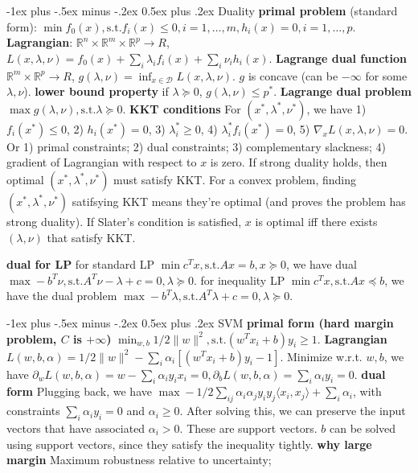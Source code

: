 \documentclass[10pt,landscape]{article}
\makeatletter
\renewcommand{\section}{\@startsection{section}{1}{0mm}%
                                {-1ex plus -.5ex minus -.2ex}%
                                {0.5ex plus .2ex}%
                                {\normalfont\large\bfseries}}
\makeatother
\begin{document}
\begin{multicols}{3}
\section{Duality}
\textbf{primal problem} (standard form): $\min f_0(x), \text{s.t.} f_i(x) \leq 0, i = 1,\ldots,m, h_i(x)=0, i = 1,\ldots,p$.
\textbf{Lagrangian}: $\mathbb{R}^n \times \mathbb{R}^m \times \mathbb{R}^p \rightarrow R$, $L(x,\lambda,\nu) = f_0(x) + \sum_i \lambda_i f_i (x) + \sum_i \nu_i h_i(x)$.
\textbf{Lagrange dual function} $\mathbb{R}^m \times \mathbb{R}^p \rightarrow R$, $g(\lambda, \nu) = \inf_{x \in \mathcal{D}} L(x, \lambda, \nu)$. $g$ is concave (can be $-\infty$ for some $\lambda,\nu$). \textbf{lower bound property} if $\lambda \succeq 0$, $g(\lambda, \nu) \leq p^*$.
\textbf{Lagrange dual problem} $\max g(\lambda,\nu), \text{s.t.} \lambda \succeq 0$. \textbf{KKT conditions} For $(x^*, \lambda^*, \nu^*)$, we have 1) $f_i(x^*) \leq 0$, 2) $h_i(x^*) = 0$, 3) $\lambda^*_i \geq 0$, 4) $\lambda^*_i f_i(x^*) = 0$, 5) $\nabla_x L(x,\lambda,\nu) = 0$. Or 1) primal constraints; 2) dual constraints; 3) complementary slackness; 4) gradient of Lagrangian with respect to $x$ is zero. If strong duality holds, then optimal $(x^*, \lambda^*, \nu^*)$ must satisfy KKT. For a convex problem, finding $(x^*, \lambda^*, \nu^*)$ satifsying KKT means they're optimal (and proves the problem has strong duality). If Slater's condition is satisfied, $x$ is optimal iff there exists $(\lambda, \nu)$ that satisfy KKT.

\textbf{dual for LP} for standard LP $\min c^T x, \text{s.t.} Ax=b, x \succeq 0$, we have dual $\max -b^T \nu, \text{s.t.} A^T\nu - \lambda + c = 0, \lambda \succeq 0$. for inequality LP $\min c^T x, \text{s.t.} Ax\preceq b$, we have the dual problem $\max -b^T \lambda, \text{s.t.} A^T\lambda + c = 0, \lambda \succeq 0$.

\section{SVM}
\textbf{primal form (hard margin problem, $C$ is $+\infty$)} $\min_{w,b} 1/2 \|w\|^2, \text{s.t.} (w^T x_i + b)y_i \geq 1$.
\textbf{Lagrangian} $L(w,b,\alpha) = 1/2 \|w\|^2 - \sum_i \alpha_i [(w^T x_i + b)y_i - 1]$. Minimize w.r.t. $w,b$, we have $\partial_w L(w,b,\alpha) = w-\sum_i \alpha_i y_i x_i = 0, \partial_b L(w,b,\alpha) =  \sum_i \alpha_i y_i = 0$.
\textbf{dual form} Plugging back, we have $\max -1/2 \sum_{ij} \alpha_i \alpha_j y_i y_j \langle x_i, x_j \rangle + \sum_i \alpha_i$, with constraints $\sum_i \alpha_i y_i = 0$ and $\alpha_i \geq 0$. After solving this, we can preserve the input vectors that have associated $\alpha_i > 0$. These are support vectors. $b$ can be solved using support vectors, since they satisfy the inequality tightly. \textbf{why large margin} Maximum robustness relative to uncertainty; 


\end{multicols}
\end{document}
